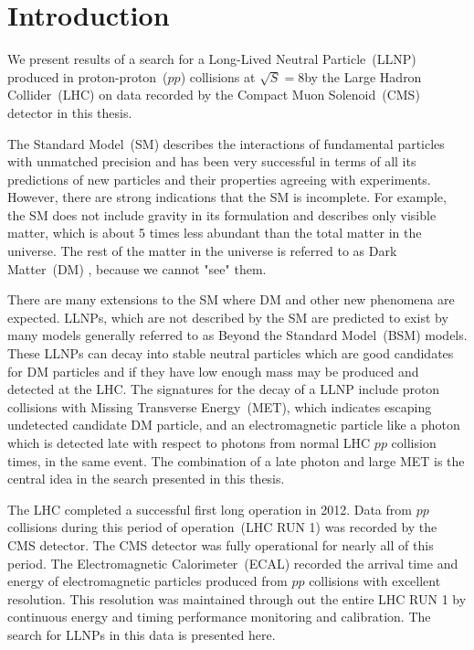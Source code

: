 \chapter{Introduction}
\par %
We present results of a search for a Long-Lived Neutral Particle~(LLNP) produced in proton-proton~($pp$) collisions at $\sqrt{S} = 8$\TeV by the Large Hadron Collider~(LHC) on data recorded by the Compact Muon Solenoid~(CMS) detector in this thesis.
\par
The Standard Model~(SM) describes the interactions of fundamental particles with unmatched precision and has been very successful in terms of all its predictions of new particles and their properties  agreeing with experiments. However, there are strong indications that the SM is incomplete. For example, the SM does not include gravity in its formulation and describes only visible matter, which is
about 5 times less abundant than the total matter in the universe. The rest of the matter in the universe is referred to as Dark Matter~(DM) \cite{DM,SUSYDM,LSPDM}, because we cannot "see" them.
\par 
There are many extensions to the SM where DM and other new phenomena are expected. LLNPs, which are not described by the SM are predicted to exist by many models generally referred to as Beyond the Standard Model~(BSM) models. These LLNPs can decay into stable neutral particles which are good candidates for DM particles and if they have low enough mass may be produced and detected at the LHC. The signatures for the decay of a LLNP include proton collisions with Missing Transverse Energy~(MET), which indicates escaping undetected candidate DM particle, and an electromagnetic particle like a photon which is detected late with respect to photons from normal LHC $pp$ collision times, in the same event. The combination of a late photon and large MET is the central idea in the search presented in this thesis.
\par
The LHC completed a successful first long operation in 2012. Data from $pp$ collisions during this period of operation~(LHC RUN 1) was recorded by the CMS detector. The CMS detector was fully operational for nearly all of this period. The Electromagnetic Calorimeter~(ECAL) recorded the arrival time and energy of electromagnetic particles produced from $pp$ collisions with excellent resolution. This resolution was maintained through out the entire LHC RUN 1 by continuous energy and timing performance monitoring and calibration. The search for LLNPs in this data is presented here.
